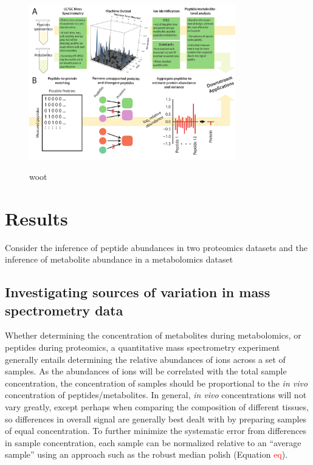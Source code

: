 \documentclass[12pt]{article}
\begin{document}
\begin{figure}
\begin{center}
\includegraphics[width = 0.8\textwidth]{Figures/MSanalysis_agg.pdf}
\label{MSworkflow}
\caption{woot}
\end{center}
\end{figure}

\section{Results}

Consider the inference of peptide abundances in two proteomics datasets and the inference of metabolite abundance in a metabolomics dataset

\subsection{Investigating sources of variation in mass spectrometry data}

Whether determining the concentration of metabolites during metabolomics, or peptides during proteomics, a quantitative mass spectrometry experiment generally entails determining the relative abundances of ions across a set of samples.  As the abundances of ions will be correlated with the total sample concentration, the concentration of samples should be proportional to the \textit{in vivo} concentration of peptides/metabolites.  In general, \textit{in vivo} concentrations will not vary greatly, except perhaps when comparing the composition of different tissues, so differences in overall signal are generally best dealt with by preparing samples of equal concentration. To further minimize the systematic error from differences in sample concentration, each sample can be normalized relative to an ``average sample'' using an approach such as the robust median polish (Equation \textcolor{red}{eq}). 
\end{document}
